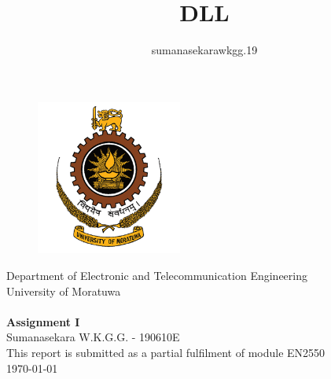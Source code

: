 \documentclass[11pt]{article}
\title{DLL}
\author{sumanasekarawkgg.19 }
\begin{document}
\thispagestyle{empty}
\begin{center}
   \begin{figure}
   \vspace*{1.5cm}
       \centering
       \includegraphics[width=4.8cm]{Images/uom.png}
   \end{figure}
   
   Department of Electronic and Telecommunication Engineering \\ University of Moratuwa \\
   \vspace{2cm}
   {\fontsize{14}{17}\selectfont\textbf{\\Assignment I\\}}
    \vspace{8cm}
    Sumanasekara W.K.G.G. - 190610E 
   \vspace{3cm}
   \\This report is submitted as a partial fulfilment of module EN2550
   \vspace{0.5cm} \\
   \today
\end{center}
\newpage
\clearpage
{} 
\end{document}
